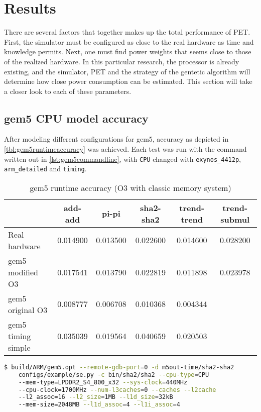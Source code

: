 \section{Results}



There are several factors that together makes up the total performance of PET. First, the simulator must be
configured as close to the real hardware as time and knowledge permits. Next, one must find power weights that
seems close to those of the realized hardware. In this particular research, the processor is already existing,
and the simulator, PET and the strategy of the gentetic algorithm will determine how close power consumption
can be estimated. This section will take a closer look to each of these parameters.

\subsection{gem5 CPU model accuracy}

After modeling different configurations for gem5, accuracy as depicted in \autoref{tbl:gem5runtimeaccuracy}
was achieved. Each test was run with the command written out in \autoref{lst:gem5commandline}, with \texttt{CPU}
changed with  \texttt{exynos\_4412p}, \texttt{arm\_detailed} and \texttt{timing}.

\begin{table}
\centering
\begin{tabular}{|l|c|c|c|c|c|}
\hline
   & add-add & pi-pi & sha2-sha2 & trend-trend & trend-submul\\
\hline
Real hardware & 0.014900  & 0.013500 & 0.022600 & 0.014600 & 0.028200\\
gem5 modified O3    & 0.017541 & 0.013790 & 0.022819 & 0.011898 & 0.023978 \\
gem5 original O3    & 0.008777 & 0.006708 & 0.010368 & 0.004344 & \\
gem5 timing simple  & 0.035039 & 0.019564 & 0.040659 & 0.020503 & \\
\hline
\end{tabular}
\caption{gem5 runtime accuracy (O3 with classic memory system)}
\label{tbl:gem5runtimeaccuracy}
\end{table}

\begin{lstlisting}[float=htb,language=sh,numbers=none,label={lst:gem5commandline},caption={gem5 Command Line}]
$ build/ARM/gem5.opt --remote-gdb-port=0 -d m5out-time/sha2-sha2
    configs/example/se.py -c bin/sha2/sha2 --cpu-type=CPU
    --mem-type=LPDDR2_S4_800_x32 --sys-clock=440MHz
    --cpu-clock=1700MHz --num-l3caches=0 --caches --l2cache
    --l2_assoc=16 --l2_size=1MB --l1d_size=32kB
    --mem-size=2048MB --l1d_assoc=4 --l1i_assoc=4
\end{lstlisting}

